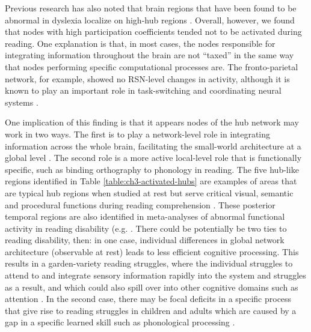 Previous research has also noted that brain regions that have been found to be abnormal in dyslexia localize on high-hub regions \citep{Bailey2018}. Overall, however, we found that nodes with high participation coefficients tended not to be activated during reading. One explanation is that, in most cases, the nodes responsible for integrating information throughout the brain are not ``taxed'' in the same way that nodes performing specific computational processes are. The fronto-parietal network, for example, showed no RSN-level changes in activity, although it is known to play an important role in task-switching and coordinating neural systems \citep{Cole2013}. 

One implication of this finding is that it appears nodes of the hub network may work in two ways. The first is to play a network-level role in integrating information across the whole brain, facilitating the small-world architecture at a global level \citep{VandenHeuvel2010}. The second role is a more active local-level role that is functionally specific, such as binding orthography to phonology in reading. The five hub-like regions identified in Table \ref{table:ch3-activated-hubs} are examples of areas that are typical hub regions when studied at rest but serve critical visual, semantic and procedural functions during reading comprehension \citep{Price2012}. These posterior temporal regions are also identified in meta-analyses of abnormal functional activity in reading disability (e.g. \cite{Maisog2008, Richlan2009}. There could be potentially be two ties to reading disability, then: in one case, individual differences in global network architecture (observable at rest) leads to less efficient cognitive processing. This results in a garden-variety reading struggles, where the individual struggles to attend to and integrate sensory information rapidly into the system and struggles as a result, and which could also spill over into other cognitive domains such as attention \citep{Paulesu2014}. In the second case, there may be focal deficits in a specific process that give rise to reading struggles in children and adults which are caused by a gap in a specific learned skill such as phonological processing \citep{Achal2016, Goswami2002}. 

